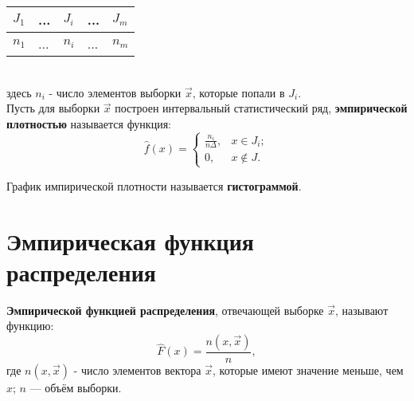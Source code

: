 \begin{tabular}{ | l | l | l | l | l | }
	\hline
	$J_1$ & ... & $J_i$ & ... & $J_m$ \\ 
	\hline
	$n_1$ & ... & $n_i$ & ... & $n_m$ \\
	\hline
\end{tabular}\\

здесь $n_i$ - число элементов выборки $\vec x$, которые попали в $J_i$.  \\

Пусть для выборки $\vec x$ построен интервальный статистический ряд, \textbf{эмпирической плотностью} называется функция:  
\begin{equation}
	\hat{f}(x) = \begin{cases}
		\frac{n_{i}}{n\Delta}, & x\in J_{i};\\
		0,                     & x\notin J.
	\end{cases}
\end{equation}

График импирической плотности называется \textbf{гистограммой}.

\section{Эмпирическая функция распределения}
\textbf{Эмпирической функцией распределения}, отвечающей выборке $\vec x$, называют функцию:
\begin{equation}
	\hat{F}(x) = \frac{n(x, \vec{x})}{n},
\end{equation}
	где $n(x, \vec{x})$ - число элементов вектора $\vec x$, которые имеют значение меньше, чем $x$; $n$ — объём выборки.